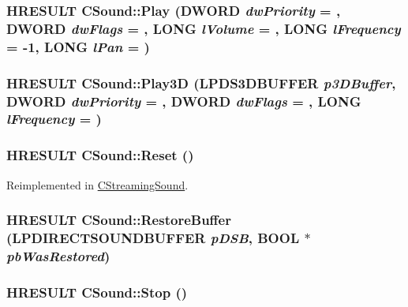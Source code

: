 \label{class_c_sound_ae4677b9565a96892a3a494698392670b}
\hypertarget{class_c_sound_a9c0e5e3cf50601f679d17a38036cef14}{
\subsubsection[{Play}]{\setlength{\rightskip}{0pt plus 5cm}HRESULT CSound::Play (DWORD {\em dwPriority} = {}, \/  DWORD {\em dwFlags} = {}, \/  LONG {\em lVolume} = {}, \/  LONG {\em lFrequency} = {\ttfamily -\/1}, \/  LONG {\em lPan} = {})}}
\label{class_c_sound_a9c0e5e3cf50601f679d17a38036cef14}
\hypertarget{class_c_sound_aac53e4ca27f447ca2477d3e9ab50938a}{
\subsubsection[{Play3D}]{\setlength{\rightskip}{0pt plus 5cm}HRESULT CSound::Play3D (LPDS3DBUFFER {\em p3DBuffer}, \/  DWORD {\em dwPriority} = {}, \/  DWORD {\em dwFlags} = {}, \/  LONG {\em lFrequency} = {})}}
\label{class_c_sound_aac53e4ca27f447ca2477d3e9ab50938a}
\hypertarget{class_c_sound_aaf2b066d599976ba180082b4fa3880e3}{
\subsubsection[{Reset}]{\setlength{\rightskip}{0pt plus 5cm}HRESULT CSound::Reset ()}}
\label{class_c_sound_aaf2b066d599976ba180082b4fa3880e3}


Reimplemented in \hyperlink{class_c_streaming_sound_a566d5512e22de66e7cfbab17784335cf}{CStreamingSound}.\hypertarget{class_c_sound_ab74aca2529b37470e7dcb7bc4eadbdbc}{
\subsubsection[{RestoreBuffer}]{\setlength{\rightskip}{0pt plus 5cm}HRESULT CSound::RestoreBuffer (LPDIRECTSOUNDBUFFER {\em pDSB}, \/  BOOL $\ast$ {\em pbWasRestored})}}
\label{class_c_sound_ab74aca2529b37470e7dcb7bc4eadbdbc}
\hypertarget{class_c_sound_af394d295721d4d8bf05dd20531b4cf91}{
\subsubsection[{Stop}]{\setlength{\rightskip}{0pt plus 5cm}HRESULT CSound::Stop ()}}
\label{class_c_sound_af394d295721d4d8bf05dd20531b4cf91}


